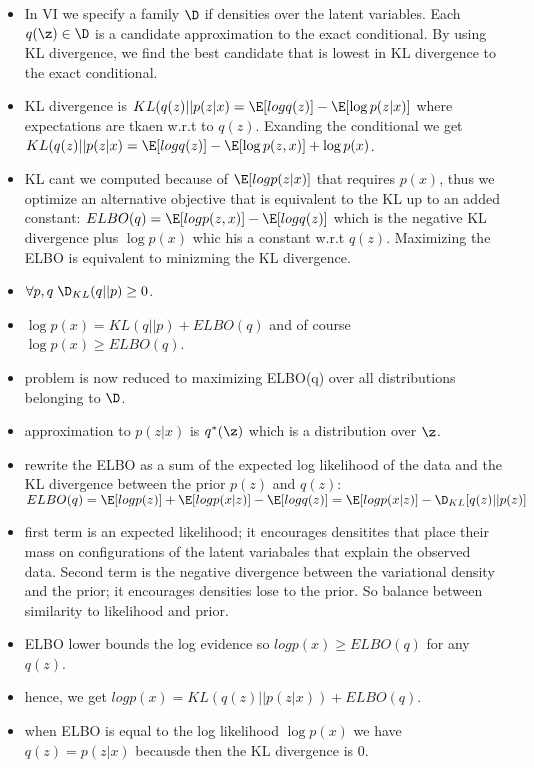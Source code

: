 \begin{itemize}
    \item In VI we specify a family $\D$ if densities over the latent variables. Each $q(\z) \in \D$ is a candidate approximation to the exact conditional. By using KL divergence, we find the best candidate that is lowest in KL divergence to the exact conditional.
    \item KL divergence is $KL(q(z)||p(z|x) = \E[log q(z)] - \E[\log p(z|x)]$ where expectations are tkaen w.r.t to $q(z)$. Exanding the conditional we get $KL(q(z)||p(z|x) = \E[log q(z)] - \E[\log p(z,x)] + \log p(x)$.
    \item KL cant we computed because of $\E[log p(z|x)]$ that requires $p(x)$, thus we optimize an alternative objective that is equivalent to the KL up to an added constant:
    $ELBO(q) = \E[logp(z,x)] - \E[log q(z)]$ which is the negative KL divergence plus $\log p(x)$ whic his a constant w.r.t $q(z)$. Maximizing the ELBO is equivalent to minizming the KL divergence.
    \item $\forall p,q \; \D_{KL}(q||p) \geq 0$. 
    \item $\log p(x) = KL(q||p) + ELBO(q)$ and of course $\log p(x) \geq ELBO(q)$. 
    \item problem is now reduced to maximizing ELBO(q) over all distributions belonging to $\D$. 
    \item approximation to $p(z|x)$ is $q^*(\z)$ which is a distribution over $\z$.
    \item rewrite the ELBO as a sum of the expected log likelihood of the data and the KL divergence between the prior $p(z)$ and $q(z)$: $ELBO(q) = \E[log p(z)] + \E[log p(x|z)] - \E[log q(z)] = \E[log p(x|z)] - \D_{KL}[q(z)||p(z)]$
    \item first term is an expected likelihood; it encourages densitites that place their mass on configurations of the latent variabales that explain the observed data. Second term is the negative divergence between the variational density and the prior; it encourages densities lose to the prior. So balance between similarity to likelihood and prior.
    \item ELBO lower bounds the log evidence so $log p(x) \geq ELBO(q)$ for any $q(z)$.
    \item hence, we get $log p(x) = KL(q(z)||p(z|x)) + ELBO(q)$.
    \item when ELBO is equal to the log likelihood $\log p(x)$ we have $q(z) = p(z|x)$ becausde then the KL divergence is 0. 
\end{itemize}

